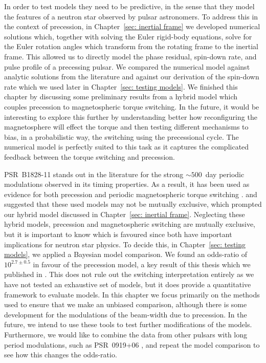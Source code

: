 \documentclass[twoside, 11pt]{thesis}
\begin{document}
In order to test models they need to be predictive, in the sense that they
model the features of a neutron star observed by pulsar astronomers. To address
this in the context of precession, in Chapter~\ref{sec: inertial frame} we
developed numerical solutions which, together with solving the Euler rigid-body
equations, solve for the Euler rotation angles which transform from the
rotating frame to the inertial frame. This allowed us to directly model the
phase residual, spin-down rate, and pulse profile of a precessing pulsar.
We compared the numerical model against analytic solutions from the literature
and against our derivation of the spin-down rate which we used later in
Chapter~\ref{sec: testing models}. We finished this chapter by discussing some
preliminary results from a hybrid model which couples precession to
magnetospheric torque switching. In the future, it would be interesting to explore
this further by understanding better how reconfiguring the magnetosphere will
effect the \citet{Deutsch1955} torque and then testing different mechanisms to
bias, in a probabilistic way, the switching using the precessional cycle. The
numerical model is perfectly suited to this task as it captures the complicated
feedback between the torque switching  and precession.

PSR~B1828-11 stands out in the literature for the strong $\sim 500$~day
periodic modulations observed in its timing properties. As a result, it has
been used as evidence for both precession \citep{Stairs2000} and periodic
magnetospheric torque switching \citep{Lyne2010}. \citet{Jones2012} and
\citet{Cordes2013} suggested that these used models may not be mutually exclusive,
which prompted our hybrid model discussed in Chapter~\ref{sec: inertial frame}.
Neglecting these hybrid models, precession and magnetospheric
switching are mutually exclusive, but it is important to know which is favoured
since both have important implications for neutron star physics. To decide
this, in Chapter~\ref{sec: testing models}, we applied a Bayesian model
comparison. We found an odds-ratio of $10^{2.7\pm 0.5}$ in favour of the
precession model, a key result of this thesis which we published in
\citet{Ashton2016}. This does not rule out the switching interpretation
entirely as we have not tested an exhaustive set of models, but it does provide
a quantitative framework to evaluate models. In this chapter  we focus
primarily on the methods used to ensure that we make an unbiased comparison, although
there is some development for the modulations of the beam-width due to
precession. In the future, we intend to use these tools to test further
modifications of the models. Furthermore, we would like to combine the data
from other pulsars with long period modulations, such as PSR~0919+06
\citep{Perera2014}, and repeat the model comparison to see how this changes the
odds-ratio.
\end{document}
